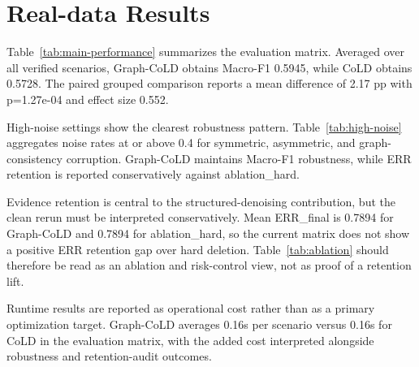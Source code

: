 \section{Real-data Results}
Table~\ref{tab:main-performance} summarizes the evaluation matrix. Averaged over all verified scenarios, Graph-CoLD obtains Macro-F1 0.5945, while CoLD obtains 0.5728. The paired grouped comparison reports a mean difference of 2.17 pp with p=1.27e-04 and effect size 0.552.

High-noise settings show the clearest robustness pattern. Table~\ref{tab:high-noise} aggregates noise rates at or above 0.4 for symmetric, asymmetric, and graph-consistency corruption. Graph-CoLD maintains Macro-F1 robustness, while ERR retention is reported conservatively against ablation_hard.

Evidence retention is central to the structured-denoising contribution, but the clean rerun must be interpreted conservatively. Mean ERR_final is 0.7894 for Graph-CoLD and 0.7894 for ablation_hard, so the current matrix does not show a positive ERR retention gap over hard deletion. Table~\ref{tab:ablation} should therefore be read as an ablation and risk-control view, not as proof of a retention lift.

Runtime results are reported as operational cost rather than as a primary optimization target. Graph-CoLD averages 0.16s per scenario versus 0.16s for CoLD in the evaluation matrix, with the added cost interpreted alongside robustness and retention-audit outcomes.
